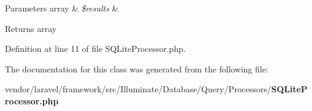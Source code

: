 \begin{DoxyParams}[1]{Parameters}
array & {\em \$results} & \\
\hline
\end{DoxyParams}
\begin{DoxyReturn}{Returns}
array 
\end{DoxyReturn}


Definition at line 11 of file S\+Q\+Lite\+Processor.\+php.



The documentation for this class was generated from the following file\+:\begin{DoxyCompactItemize}
\item 
vendor/laravel/framework/src/\+Illuminate/\+Database/\+Query/\+Processors/{\bf S\+Q\+Lite\+Processor.\+php}\end{DoxyCompactItemize}
